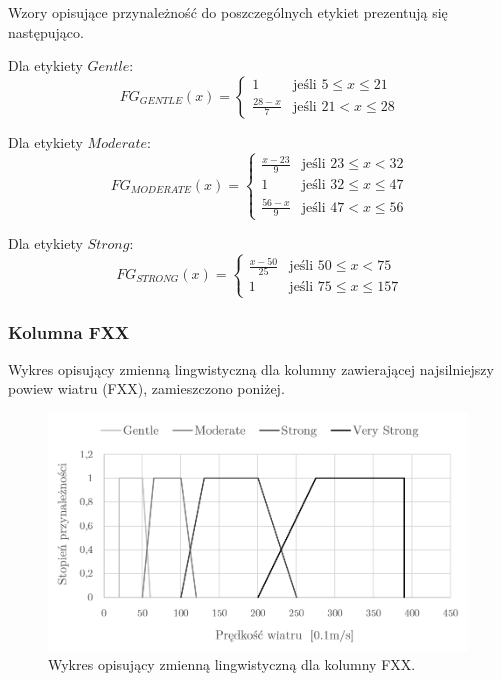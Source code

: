 \documentclass{classrep}
\begin{document}
Wzory opisujące przynależność do poszczególnych etykiet prezentują się następująco. \newline

Dla etykiety $Gentle$:
\begin{equation}
{FG}_{GENTLE}(x)= \left\{ \begin{array}{ll}
1 			& \textrm{jeśli $5 \leq x \leq 21$} \\
\frac{28-x}{7} 	& \textrm{jeśli $21 < x \leq 28$}
\end{array} \right.
\end{equation}

Dla etykiety $Moderate$:
\begin{equation}
{FG}_{MODERATE}(x)= \left\{ \begin{array}{ll}
\frac{x-23}{9} 	& \textrm{jeśli $23 \leq x < 32$} \\
1 			& \textrm{jeśli $32 \leq x \leq 47$} \\
\frac{56-x}{9} 	& \textrm{jeśli $47 < x \leq 56$}
\end{array} \right.
\end{equation}

Dla etykiety $Strong$:
\begin{equation}
{FG}_{STRONG}(x)= \left\{ \begin{array}{ll}
\frac{x-50}{25} 	 & \textrm{jeśli $50 \leq x < 75$} \\
1 			 & \textrm{jeśli $75 \leq x \leq 157$}
\end{array} \right.
\end{equation}

\clearpage



\subsubsection{Kolumna FXX}
Wykres opisujący zmienną lingwistyczną dla kolumny zawierającej najsilniejszy powiew wiatru (FXX), zamieszczono poniżej.
\begin{figure}[H]
	\centering
	\includegraphics[width=0.99\textwidth]{Pictures/TermsCharts/FXX.png}
	\caption{Wykres opisujący zmienną lingwistyczną dla kolumny FXX.}
\end{figure}
\end{document}
